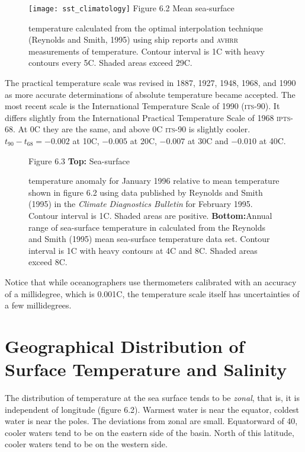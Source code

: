 \begin{figure}[t!]
\texttt{[image: sst\_climatology]}
\footnotesize
Figure 6.2 Mean sea-surface \rule{0mm}{3ex}temperature calculated from
the optimal interpolation technique (Reynolds and Smith, 1995) using
ship reports and \textsc{avhrr} measurements of temperature. Contour
interval is 1\degrees C with heavy contours every 5\degrees C. Shaded
areas exceed 29\degrees C.
\label{fig:sst_climatology}
\vspace{-4ex}
\end{figure}

The practical temperature scale was revised in 1887, 1927, 1948, 1968,
and 1990 as more accurate determinations of absolute temperature
became accepted. The most recent scale is the International
Temperature Scale of 1990
(\textsc{its}-90). It differs slightly from the International Practical
Temperature Scale of 1968 \textsc{ipts}-68. At 0\degrees C they are
the same, and above 0\degrees C \textsc{its}-90 is slightly
cooler. $t_{90}-t_{68} = -0.002$ at 10\degrees C, $-0.005$ at
20\degrees C, $-0.007$ at 30\degrees C and $-0.010$ at 40\degrees C.

\begin{figure}[b!]
\vspace{-3ex}
\footnotesize
Figure 6.3 \textbf{Top:} Sea-surface \rule{0mm}{3ex}temperature
anomaly for January 1996 relative to mean temperature shown in figure
6.2 using data published by Reynolds and Smith (1995) in the
\textit{Climate Diagnostics Bulletin} for February 1995. Contour
interval is 1\degrees C. Shaded areas are
positive. \textbf{Bottom:}Annual range of sea-surface temperature in
 calculated from the Reynolds and Smith (1995) mean
sea-surface temperature data set. Contour interval is 1\degrees C with
heavy contours at 4\degrees C and 8\degrees C. Shaded areas exceed
8\degrees C.
\label{fig:SSTvariability}
\end{figure}

Notice that while oceanographers use thermometers calibrated with an
accuracy of a millidegree, which is
0.001\degrees C, the temperature scale itself has uncertainties of a
few millidegrees.

\section[Geographical Distribution]{Geographical Distribution of Surface
Temperature and Salinity} The distribution
of temperature at the sea surface tends to be \textit{zonal},
that is, it is independent of longitude (figure
6.2). Warmest water is near the equator, coldest water is near the
poles. The deviations from zonal are small. Equatorward of 40\degrees,
cooler waters tend to be on the eastern side of the basin. North of
this latitude, cooler waters tend to be on the western side.

